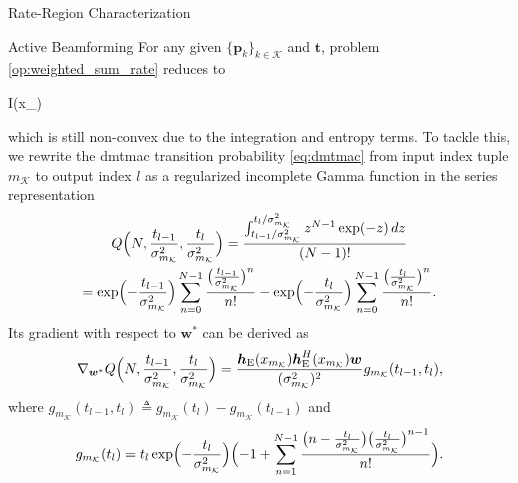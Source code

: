 \documentclass[journal]{IEEEtran}
\begin{document}
\begin{section}{Rate-Region Characterization}
	\begin{subsection}{Active Beamforming}
		For any given $\{\boldsymbol{p}_k\}_{k \in \mathcal{K}}$ and $\boldsymbol{t}$, problem \eqref{op:weighted_sum_rate} reduces to
		\begin{maxi!}
			{}{I(x_{})}{\label{op:active_beamforming}}{\label{ob:active_beamforming}}
			\addConstraint{\eqref{co:transmit_power},}
		\end{maxi!}
		which is still non-convex due to the integration and entropy terms.
		To tackle this, we rewrite the \gls{dmtmac} transition probability \eqref{eq:dmtmac} from input index tuple $m_{\mathcal{K}}$ to output index $l$ as a regularized incomplete Gamma function in the series representation \cite[Theorem 3]{Jameson2016}
		\begin{equation}
			\begin{gathered}
				Q\Bigl(N,\frac{t_{l-1}}{\sigma_{m_{\mathcal{K}}}^2},\frac{t_l}{\sigma_{m_{\mathcal{K}}}^2}\Bigr) = \frac{\int_{{t_{l-1}}/{\sigma_{m_{\mathcal{K}}}^2}}^{{t_l}/{\sigma_{m_{\mathcal{K}}}^2}} z^{N-1} \exp(-z) \, d z}{(N-1)!}\\
				= \exp \Bigl(-\frac{t_{l-1}}{\sigma_{m_{\mathcal{K}}}^2}\Bigr) \sum_{n=0}^{N-1} \frac{\bigl(\frac{t_{l-1}}{\sigma_{m_{\mathcal{K}}}^2}\bigr)^n}{n!} - \exp \Bigl(-\frac{t_l}{\sigma_{m_{\mathcal{K}}}^2}\Bigr) \sum_{n=0}^{N-1} \frac{\bigl(\frac{t_l}{\sigma_{m_{\mathcal{K}}}^2}\bigr)^n}{n!}.
			\end{gathered}
			\label{eq:regularized_incomplete_gamma}
		\end{equation}
		Its gradient with respect to $\boldsymbol{w}^*$ can be derived as
		\begin{equation}
			\nabla_{\boldsymbol{w}^*} Q\Bigl(N,\frac{t_{l-1}}{\sigma_{m_{\mathcal{K}}}^2},\frac{t_l}{\sigma_{m_{\mathcal{K}}}^2}\Bigr) = \frac{\boldsymbol{h}_{\mathrm{E}}(x_{m_{\mathcal{K}}})\boldsymbol{h}_{\mathrm{E}}^H(x_{m_{\mathcal{K}}})\boldsymbol{w}}{(\sigma_{m_{\mathcal{K}}}^2)^2} g_{m_{\mathcal{K}}}(t_{l-1},t_l),
			\label{eq:regularized_incomplete_gamma_gradient}
		\end{equation}
		where $g_{m_{\mathcal{K}}}(t_{l-1},t_l) \triangleq g_{m_{\mathcal{K}}}(t_l)-g_{m_{\mathcal{K}}}(t_{l-1})$ and
		\begin{equation}
			g_{m_{\mathcal{K}}}(t_l) = t_l\exp\Bigl(-\frac{t_l}{\sigma_{m_{\mathcal{K}}}^2}\Bigr)\Bigl(-1+\sum_{n=1}^{N-1} \frac{\bigl(n - \frac{t_l}{\sigma_{m_{\mathcal{K}}}^2}\bigr) \bigl(\frac{t_l}{\sigma_{m_{\mathcal{K}}}^2}\bigr)^{n-1}}{n!}\Bigr).

\end{equation}
\end{subsection}
\end{section}
\end{document}
